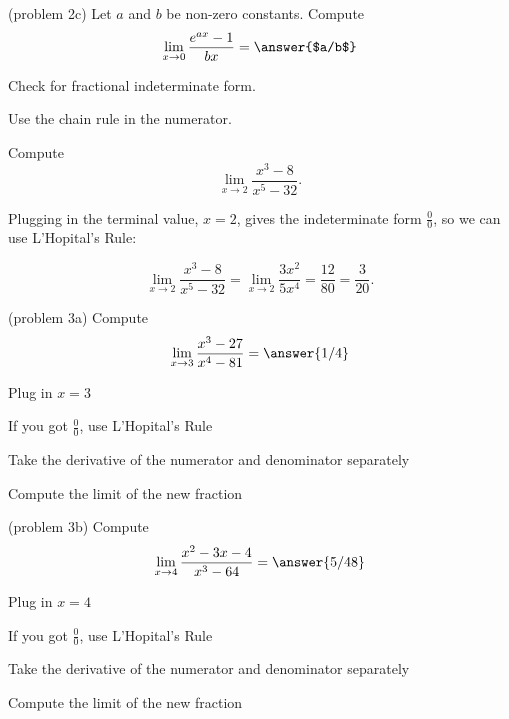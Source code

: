 \documentclass{ximera}
\begin{document}
\begin{problem}(problem 2c)
 Let $a$ and $b$ be non-zero constants. Compute
  \[
  \lim_{x \to 0} \frac{e^{ax} - 1}{bx} = \answer{$a/b$}
  \]
  
    \begin{hint}
      Check for fractional indeterminate form.
    \end{hint}
    
	  \begin{hint}
      Use the chain rule in the numerator.
    \end{hint}
	
\end{problem}


\begin{example}[example 3]
Compute  
       \[
            \lim_{x \to 2} \frac{x^3 - 8}{x^5 - 32}.
        \]
            
Plugging in the terminal value, $x=2$, gives 
the indeterminate form $\frac00$, so we can use L'Hopital's Rule:
 
\[\lim_{x \to 2} \frac{x^3 - 8}{x^5 - 32} = \lim_{x \to 2} \frac{3x^2}{5x^4} = \frac{12}{80} = \frac{3}{20}.\]
\end{example}

\begin{problem}(problem 3a)
  Compute
  \[
  \lim_{x \to 3} \frac{x^3 - 27}{x^4 - 81} = \answer{1/4}
  \]
  
    \begin{hint}
      Plug in $x=3$
    \end{hint}
    \begin{hint}
      If you got $\frac00$, use L'Hopital's Rule
    \end{hint}
    \begin{hint}
      Take the derivative of the numerator and denominator separately
    \end{hint}
	  \begin{hint}
      Compute the limit of the new fraction
    \end{hint}
  
\end{problem}


\begin{problem}(problem 3b)
  Compute
  \[
  \lim_{x \to 4} \frac{x^2 - 3x - 4}{x^3 - 64} = \answer{5/48}
  \]
  
    \begin{hint}
      Plug in $x=4$
    \end{hint}
    \begin{hint}
      If you got $\frac00$, use L'Hopital's Rule
    \end{hint}
    \begin{hint}
      Take the derivative of the numerator and denominator separately
    \end{hint}
	  \begin{hint}
      Compute the limit of the new fraction
    \end{hint}
  
\end{problem}
\end{document}
